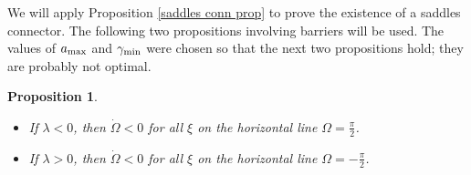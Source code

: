 \documentclass[11 pt]{article}
\newtheorem{prop}[thm]{Proposition}%
\renewcommand\l{\lambda}
\renewcommand\({\left(}
\renewcommand\){\right)}
\newcommand\<{\langle}
\renewcommand\>{\rangle}
\renewcommand\l{\lambda}
\newcommand\8{\infty}
\begin{document}
We will apply Proposition \ref{saddles conn prop} to prove the existence of a saddles connector. The following two propositions involving barriers will be used. The values of $a_{\rm{max}}$ and $\gamma_{\rm{min}}$ were chosen so that the next two propositions hold; they are probably not optimal. 

\medskip
\medskip

\begin{prop}\label{horiz barr prop}\: $\phantom{nix}$
\begin{itemize}
\item[$\bullet$] If $\l < 0$, then $\dot{\Omega}< 0$ for all $\xi$ on the horizontal line $\Omega = \frac{\pi}{2}$.
\item[$\bullet$] If $\l > 0$, then $\dot{\Omega}<0$ for all $\xi$ on the horizontal line $\Omega = -\frac{\pi}{2}$. 
\end{itemize}
\end{prop}
\end{document}
